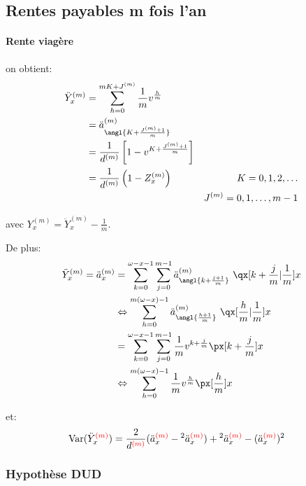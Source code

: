 \documentclass[10pt, french]{article}
\begin{document}
\begin{multicols*}{3}
\subsection{Rentes payables m fois l'an}

\paragraph{Rente viagère}
on obtient:
\begin{align*}
	\ddot{Y}_{x}^{(m)} 
	&= 	\sum_{h = 0}^{m K + J^{(m)}} \frac{1}{m} v^{\frac{h}{m}}	\\
	&= 	\ddot{a}^{(m)}_{\angl{K + \frac{J^{(m)} + 1}{m}}}	\\
	&=	\frac{1}{d^{(m)}} \left[ 1 - v^{K + \frac{J^{(m)} + 1}{m}} \right]	\\
	&=	\frac{1}{d^{(m)}} \left( 1 - Z_{x}^{(m)} \right)			&K = 0, 1, 2, \dots	\\
	&\	&J^{(m)} = 0, 1, \dots, m - 1
\end{align*}

avec ${Y}_{x}^{(m)} = \ddot{Y}_{x}^{(m)} - \frac{1}{m}$.

De plus:
\begin{align*}
	\ddot{Y}_{x}^{(m)} = \ddot{a}_{x}^{(m)}
	&= 	\sum_{k = 0}^{\omega -x - 1}\sum_{j = 0}^{m - 1} \ddot{a}^{(m)}_{\angl{k + \frac{j + 1}{m}}} \ \qx[k + \frac{j}{m}	| \frac{1}{m}]{x}\\
	&\Leftrightarrow 	\sum_{h = 0}^{m (\omega - x) - 1} \ddot{a}^{(m)}_{\angl{\frac{h + 1}{m}}} \ \qx[\frac{h}{m}	| \frac{1}{m}]{x}\\
	&= 	\sum_{k = 0}^{\omega -x - 1}\sum_{j = 0}^{m - 1} \frac{1}{m} v^{k + \frac{j}{m}} \px[k + \frac{j}{m}]{x}	\\
	&\Leftrightarrow 	\sum_{h = 0}^{m (\omega - x) - 1} \frac{1}{m} v^{\frac{h}{m}} \px[\frac{h}{m}]{x}
\end{align*}

et:
\begin{align*}
	\text{Var}(\ddot{Y}_{x}^{\textcolor{red}{(m)}})
	&=	\frac{2}{d^{\textcolor{red}{(m)}}}
		(\ddot{a}_{x}^{\textcolor{red}{(m)}} - \prescript{2}{}{\ddot{a}}_{x}^{\textcolor{red}{(m)}}) + 
		\prescript{2}{}{\ddot{a}}_{x}^{\textcolor{red}{(m)}} - 
		(\ddot{a}_{x}^{\textcolor{red}{(m)}})^{2}
\end{align*}

\subsubsection*{Hypothèse DUD}


\end{multicols*}
\end{document}
